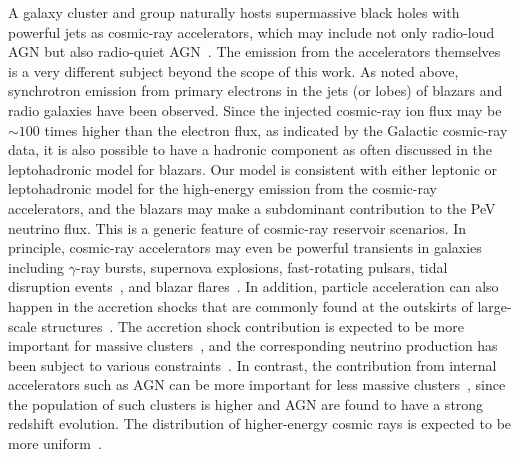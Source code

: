 \documentclass[aps,prd,onecolumn,superscriptaddress,11pt]{revtex4}
\begin{document}
A galaxy cluster and group naturally hosts supermassive black holes with powerful jets as cosmic-ray accelerators, which may include not only radio-loud AGN but also radio-quiet AGN~\cite{Murase:2015ndr}. The emission from the accelerators themselves is a  very different subject beyond the scope of this work. As noted above, synchrotron emission from primary electrons in the jets (or lobes) of blazars and radio galaxies have been observed. Since the injected cosmic-ray ion flux may be $\sim100$ times higher than the electron flux, as indicated by the Galactic cosmic-ray data, it is also possible to have a hadronic component as often discussed in the leptohadronic model for blazars. Our model is consistent with either leptonic or leptohadronic model for the high-energy emission from the cosmic-ray accelerators, and the blazars may make a subdominant contribution to the PeV neutrino flux. This is a generic feature of cosmic-ray reservoir scenarios.
In principle, cosmic-ray accelerators may even be powerful transients in galaxies including $\gamma$-ray bursts, supernova explosions, fast-rotating pulsars, tidal disruption events~\cite{Waxman:2013zda,Senno:2015tra}, and blazar flares~\cite{Dermer:2014vaa}. In addition, particle acceleration can also happen in the accretion shocks that are commonly found at the outskirts of large-scale structures~\cite{Kang:1995xw,Inoue:2007kn}. 
The accretion shock contribution is expected to be more important for massive clusters~\cite{Murase:2008yt,FO16,2016PhRvD..94j3006M}, and the corresponding neutrino production has been subject to various constraints~\cite{Kushnir:2009vp,FO16,2015A&A...578A..32Z,2016PhRvD..94j3006M}. In contrast, the contribution from internal accelerators such as AGN can be more important for less massive clusters~\cite{Murase:2008yt,Kotera:2009ms,Murase:2013rfa}, since the population of such clusters is higher and AGN are found to have a strong redshift evolution. The distribution of higher-energy cosmic rays is expected to be more uniform~\cite{Keshet:2010aq}.
\end{document}
